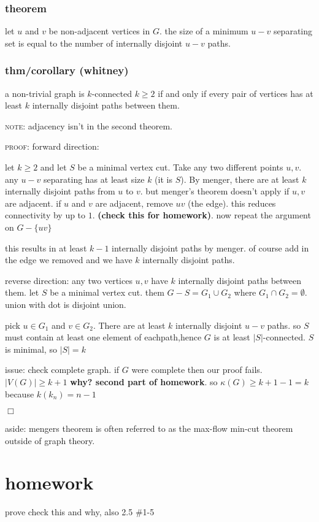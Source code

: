 \documentclass[letterpaper]{article}
\begin{document}
\subsubsection*{theorem}
let $u$ and $v$ be non-adjacent vertices in $G$. the size of a minimum $u-v$ separating set is equal to the number of internally disjoint $u-v$ paths.

\subsubsection*{thm/corollary (whitney)}
a non-trivial graph is $k$-connected $k\ge 2$ if and only if every pair of vertices has at least $k$ internally disjoint paths between them.

{\scshape note:} adjacency isn't in the second theorem.

{\scshape proof:} forward direction:

let $k\ge 2$ and let $S$ be a minimal vertex cut. Take any two different points $u,v$. any $u-v$ separating has at least size $k$ (it is $S$). By menger, there are at least $k$ internally disjoint paths from $u$ to $v$. but menger's theorem doesn't apply if $u,v$ are adjacent. if $u$ and $v$ are adjacent, remove $uv$ (the edge). this reduces connectivity by up to $1$. {\bfseries (check this for homework)}. now repeat the argument on $G-\{uv\}$

this results in at least $k-1$ internally disjoint paths by menger. of course add in the edge we removed and we have $k$ internally disjoint paths.

reverse direction:
any two vertices $u,v$ have $k$ internally  disjoint paths between them. let $S$ be a minimal vertex cut. them $G-S=G_1\cup G_2$ where $G_1\cap G_2=\emptyset$. union with dot is disjoint union.

pick $u\in G_1$ and $v\in G_2$. There are at least $k$ internally disjoint $u-v$ paths. so $S$ must contain at least one element of eachpath,hence $G$ is at least $|S|$-connected. $S$ is minimal, so $|S|=k$

issue: check complete graph. if $G$ were complete then our proof fails. $|V(G)|\ge k+1$ {\bfseries why? second part of homework}. so $\kappa(G)\ge k+1-1=k$ because $k(k_n)=n-1$ 

$\Box$

aside:
mengers theorem is often referred to as the max-flow min-cut theorem outside of graph theory.

\section*{homework}
prove check this and why, also 2.5 \#1-5
\end{document}
